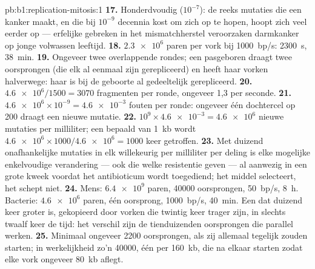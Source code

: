 \begin{solution}{pb:b1:replication-mitosis:1}
\textbf{17.} Honderdvoudig ($10^{-7}$): de reeks mutaties die een kanker maakt, en
die bij $10^{-9}$ decennia kost om zich op te hopen, hoopt zich veel eerder op ---
erfelijke gebreken in het mismatchherstel veroorzaken darmkanker op jonge
volwassen leeftijd.
\textbf{18.} $\num{2.3e6}$ paren per vork bij \qty{1000}{bp/s}: \qty{2300}{s},
\qty{38}{min}.
\textbf{19.} Ongeveer twee overlappende rondes; een pasgeboren  draagt twee
oorsprongen (die elk al eenmaal zijn gerepliceerd) en heeft haar vorken halverwege:
haar  is bij de geboorte al gedeeltelijk gerepliceerd.
\textbf{20.} $\num{4.6e6}/1500 = 3070$ fragmenten per ronde, ongeveer 1,3 per
seconde.
\textbf{21.} $\num{4.6e6}\times 10^{-9} = \num{4.6e-3}$ fouten per ronde: ongeveer
één dochtercel op 200 draagt een nieuwe mutatie.
\textbf{22.} $10^9\times\num{4.6e-3} = \num{4.6e6}$ nieuwe mutaties per
milliliter; een bepaald  van \qty{1}{kb} wordt $\num{4.6e6}\times
1000/\num{4.6e6} = 1000$ keer getroffen.
\textbf{23.} Met duizend onafhankelijke mutaties in elk willekeurig  per
milliliter per deling is elke mogelijke enkelvoudige verandering --- ook die welke
resistentie geven --- al aanwezig in een grote kweek voordat het antibioticum wordt
toegediend; het middel selecteert, het schept niet.
\textbf{24.} Mens: $\num{6.4e9}$ paren, \num{40000} oorsprongen, \qty{50}{bp/s},
\qty{8}{h}. Bacterie: $\num{4.6e6}$ paren, één oorsprong, \qty{1000}{bp/s},
\qty{40}{min}. Een  dat duizend keer groter is, gekopieerd door vorken die
twintig keer trager zijn, in slechts twaalf keer de tijd: het verschil zijn de
tienduizenden oorsprongen die parallel werken.
\textbf{25.} Minimaal ongeveer \num{2200} oorsprongen, als zij allemaal tegelijk
zouden starten; in werkelijkheid zo'n \num{40000}, één per \qty{160}{kb}, die na
elkaar starten zodat elke vork ongeveer \qty{80}{kb} aflegt.
\end{solution}
